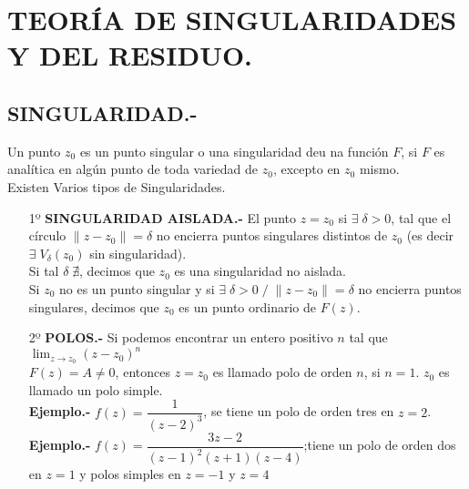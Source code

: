 \documentclass[10pt,a4paper]{article}
\author{José Jácome}
\begin{document}
\section{TEORÍA DE SINGULARIDADES Y DEL RESIDUO.}
\subsection{SINGULARIDAD.-}
Un punto $z_0$ es un punto singular o una singularidad deu na función $F$, si $F$ es analítica en algún punto de toda variedad de $z_0$, excepto en $z_0$ mismo. \\
Existen Varios tipos de Singularidades.
\begin{enumerate}
\item[1º] \textbf{SINGULARIDAD AISLADA.-} El punto $z = z_0$ si $\exists \; \delta > 0$, tal que el círculo $\parallel z-z_0 \parallel= \delta$ no encierra puntos singulares distintos de $z_0$ (es decir $\exists \; V_{\delta} (z_0)$ sin singularidad). \\
Si tal $\delta \; \nexists $, decimos que $z_0$ es una singularidad no aislada. \\
Si $z_0$ no es un punto singular y si $\exists \; \delta > 0 \; / \; \parallel z - z_0 \parallel = \delta$ no encierra puntos singulares, decimos que $z_0$ es un punto ordinario de $F(z)$.
\item[2º] \textbf{POLOS.-} Si podemos encontrar un entero positivo $n$ tal que $\displaystyle{\lim_{ z \to z_0} (z-z_0)^n}$   \\$F(z) = A \neq 0$, entonces $z = z_0$ es llamado polo de orden $n$, si $n = 1$. $z_0$ es llamado un polo simple.\\
\textbf{Ejemplo.-} $f(z) = \dfrac{1}{(z-2)^3}$, se tiene un polo de orden tres en $z = 2$. \\
\textbf{Ejemplo.-} $f(z) = \dfrac{3 z - 2}{(z-1)^2(z+1)(z-4)}$;tiene un polo de orden dos en $z = 1$ y polos simples en $z = -1$ y $z = 4$ 

\end{enumerate}
\end{document}
